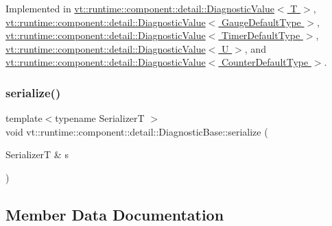 Implemented in \hyperlink{structvt_1_1runtime_1_1component_1_1detail_1_1_diagnostic_value_aa7bcf117cb8a70cee25cfd4522ca0b68}{vt\+::runtime\+::component\+::detail\+::\+Diagnostic\+Value$<$ T $>$}, \hyperlink{structvt_1_1runtime_1_1component_1_1detail_1_1_diagnostic_value_aa7bcf117cb8a70cee25cfd4522ca0b68}{vt\+::runtime\+::component\+::detail\+::\+Diagnostic\+Value$<$ Gauge\+Default\+Type $>$}, \hyperlink{structvt_1_1runtime_1_1component_1_1detail_1_1_diagnostic_value_aa7bcf117cb8a70cee25cfd4522ca0b68}{vt\+::runtime\+::component\+::detail\+::\+Diagnostic\+Value$<$ Timer\+Default\+Type $>$}, \hyperlink{structvt_1_1runtime_1_1component_1_1detail_1_1_diagnostic_value_aa7bcf117cb8a70cee25cfd4522ca0b68}{vt\+::runtime\+::component\+::detail\+::\+Diagnostic\+Value$<$ U $>$}, and \hyperlink{structvt_1_1runtime_1_1component_1_1detail_1_1_diagnostic_value_aa7bcf117cb8a70cee25cfd4522ca0b68}{vt\+::runtime\+::component\+::detail\+::\+Diagnostic\+Value$<$ Counter\+Default\+Type $>$}.

\mbox{\label{structvt_1_1runtime_1_1component_1_1detail_1_1_diagnostic_base_a7954f310c9189c4d6ff43f7d0029a98f}} 
\subsubsection{\texorpdfstring{serialize()}{serialize()}}
{\footnotesize\ttfamily template$<$typename SerializerT $>$ \\
void vt\+::runtime\+::component\+::detail\+::\+Diagnostic\+Base\+::serialize (\begin{DoxyParamCaption}\item[{SerializerT \&}]{s }\end{DoxyParamCaption})\hspace{0.3cm}{\ttfamily [inline]}}



\subsection{Member Data Documentation}
\mbox{\label{structvt_1_1runtime_1_1component_1_1detail_1_1_diagnostic_base_a1c70c4da286b442bf1dd0285f5c10fb3}} 
